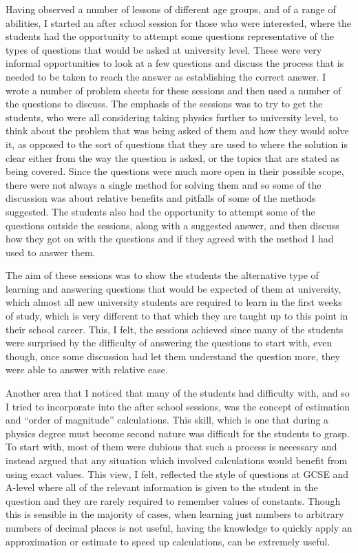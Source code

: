 	Having observed a number of lessons of different age groups, and of a range of abilities, I started an after school session for those who were interested, where the students had the opportunity to attempt some questions representative of the types of questions that would be asked at university level. These were very informal opportunities to look at a few questions and discuss the process that is needed to be taken to reach the answer as establishing the correct answer. I wrote a number of problem sheets for these sessions and then used a number of the questions to discuss. The emphasis of the sessions was to try to get the students, who were all considering taking physics further to university level, to think about the problem that was being asked of them and how they would solve it, as opposed to the sort of questions that they are used to where the solution is clear either from the way the question is asked, or the topics that are stated as being covered. Since the questions were much more open in their possible scope, there were not always a single method for solving them and so some of the discussion was about relative benefits and pitfalls of some of the methods suggested. The students also had the opportunity to attempt some of the questions outside the sessions, along with a suggested answer, and then discuss how they got on with the questions and if they agreed with the method I had used to answer them.

	The aim of these sessions was to show the students the alternative type of learning and answering questions that would be expected of them at university, which almost all new university students are required to learn in the first weeks of study, which is very different to that which they are taught up to this point in their school career. This, I felt, the sessions achieved since many of the students were surprised by the difficulty of answering the questions to start with, even though, once some discussion had let them understand the question more, they were able to answer with relative ease.

    Another area that I noticed that many of the students had difficulty with, and so I tried to incorporate into the after school sessions, was the concept of estimation and ``order of magnitude'' calculations. This skill, which is one that during a physics degree must become second nature was difficult for the students to grasp. To start with, most of them were dubious that such a process is necessary and instead argued that any situation which involved calculations would benefit from using exact values. This view, I felt, reflected the style of questions at GCSE and A-level where all of the relevant information is given to the student in the question and they are rarely required to remember values of constants. Though this is sensible in the majority of cases, when learning just numbers to arbitrary numbers of decimal places is not useful, having the knowledge to quickly apply an approximation or estimate to speed up calculations, can be extremely useful.

